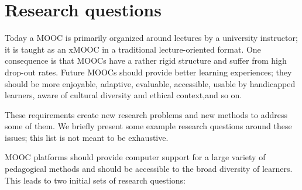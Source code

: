 \section{Research questions}
Today a MOOC  is primarily organized around lectures by a university instructor; it is taught as an xMOOC in a traditional lecture-oriented format. One consequence is that MOOCs have a rather rigid structure and suffer from high drop-out rates.  Future MOOCs should provide better learning experiences; they should be more enjoyable, adaptive, evaluable, accessible, usable by handicapped learners, aware of cultural diversity and ethical context,and so on.

These requirements create new research problems and new methods to address some of them. We briefly present some example research questions around these issues; this list is not meant to be exhaustive.  

\medskip
MOOC platforms should provide computer support for a large variety of pedagogical methods and should be accessible to the broad diversity of learners. This leads to two initial sets of research questions:
 

